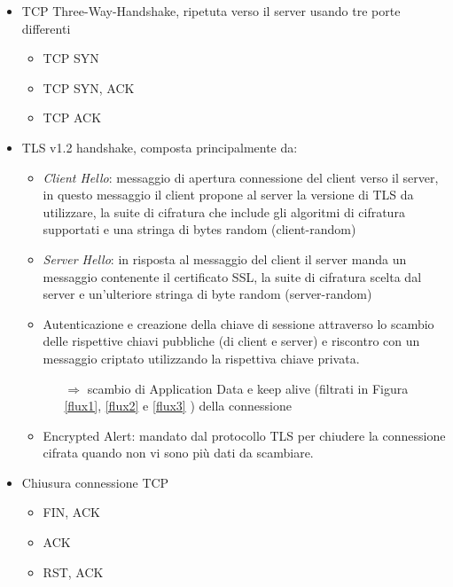 \documentclass{article}
\begin{document}
\begin{itemize}
  \item TCP Three-Way-Handshake, ripetuta verso il server usando tre porte differenti
      \begin{itemize}
    \item TCP SYN
    \item TCP SYN, ACK
    \item TCP ACK
  \end{itemize}
    \item TLS v1.2 handshake, composta principalmente da: 
      \begin{itemize}
        \item \textit{Client Hello}: messaggio di apertura connessione del client verso il server, 
        in questo messaggio il client propone al server la versione di TLS 
        da utilizzare, la suite di cifratura che include gli algoritmi di 
        cifratura supportati e una stringa di bytes random (client-random)
        \item \textit{Server Hello}: in risposta al messaggio del client il server manda un 
        messaggio contenente il certificato SSL, la suite di 
        cifratura scelta dal server e un'ulteriore stringa di 
        byte random (server-random)
        \item Autenticazione e creazione della chiave di sessione attraverso lo scambio
        delle rispettive chiavi pubbliche (di client e server) e riscontro 
        con un messaggio criptato utilizzando la rispettiva chiave privata. 
        \begin{itemize}
          \item[$\Rightarrow $] scambio di Application Data e keep alive (filtrati in Figura \ref{flux1}, \ref{flux2} e \ref{flux3} )  della connessione
        \end{itemize}
        \item Encrypted Alert: mandato dal protocollo TLS per chiudere la connessione cifrata 
        quando non vi sono più dati da scambiare.
      \end{itemize}
      \item Chiusura connessione TCP 
      \begin{itemize}
        \item FIN, ACK
        \item ACK
        \item RST, ACK
      \end{itemize}
\end{itemize}
\end{document}
